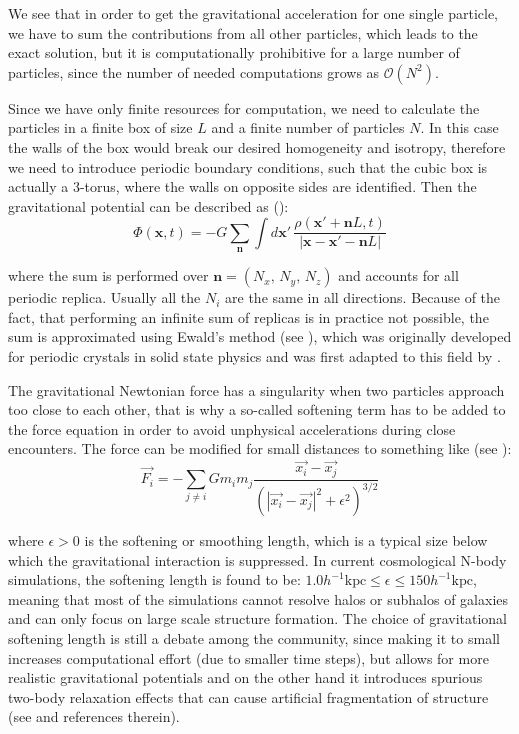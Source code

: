 We see that in order to get the gravitational acceleration for one
single particle, we have to sum the contributions from all other particles,
which leads to the exact solution, but it is computationally prohibitive
for a large number of particles, since the number of needed computations
grows as $\mathcal{O}(N^{2})$. 

Since we have only finite resources for computation, we need to calculate
the particles in a finite box of size $L$ and a finite number of
particles $N$. In this case the walls of the box would break our
desired homogeneity and isotropy, therefore we need to introduce periodic
boundary conditions, such that the cubic box is actually a 3-torus,
where the walls on opposite sides are identified. Then the gravitational
potential can be described as (\citet{dehnen_n-body_2011}): 
\begin{equation}
\Phi(\mathbf{x},t)=-G\sum_{\mathbf{n}}\int d\mathbf{x}'\,\frac{\rho(\mathbf{x}'+\mathbf{n}L,t)}{\left|\mathbf{x-x}'-\mathbf{n}L\right|}
\end{equation}


where the sum is performed over $\mathbf{n}=(N_{x},\,N_{y},\,N_{z})$
and accounts for all periodic replica. Usually all the $N_{i}$ are
the same in all directions. Because of the fact, that performing an
infinite sum of replicas is in practice not possible, the sum is approximated
using Ewald's method (see \citet{ewald_berechnung_1921}), which was
originally developed for periodic crystals in solid state physics
and was first adapted to this field by \citet{hernquist_application_1991}.

The gravitational Newtonian force has a singularity when two particles
approach too close to each other, that is why a so-called softening
term has to be added to the force equation in order to avoid unphysical
accelerations during close encounters. The force can be modified for
small distances to something like (see \citet{trenti_gravitational_2008}):
\begin{equation}
\vec{F_{i}}=-\sum_{j\neq i}Gm_{i}m_{j}\frac{\vec{x_{i}}-\vec{x_{j}}}{\left(\left|\vec{x_{i}}-\vec{x_{j}}\right|^{2}+\epsilon^{2}\right)^{3/2}}
\end{equation}


where $\epsilon>0$ is the softening or smoothing length, which is
a typical size below which the gravitational interaction is suppressed.
In current cosmological N-body simulations, the softening length is
found to be: $1.0h^{-1}\mbox{kpc}\leq\epsilon\leq150h^{-1}\mbox{kpc}$,
meaning that most of the simulations cannot resolve halos or subhalos
of galaxies and can only focus on large scale structure formation.
The choice of gravitational softening length is still a debate among
the community, since making it to small increases computational effort
(due to smaller time steps), but allows for more realistic gravitational
potentials and on the other hand it introduces spurious two-body relaxation
effects that can cause artificial fragmentation of structure (see
\citet{kuhlen_numerical_2012} and references therein).

